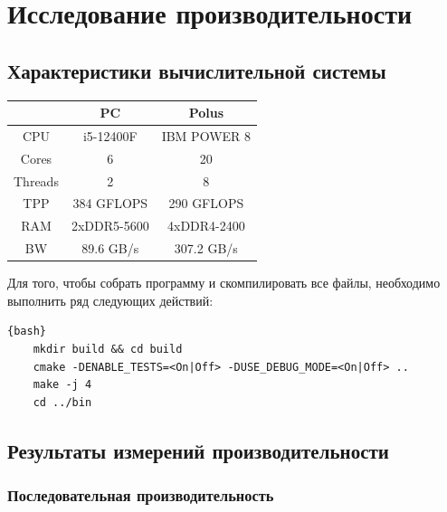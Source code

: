 \documentclass[12pt, a4paper]{article}
\begin{document}
\newpage

\section{Исследование производительности}

\subsection{Характеристики вычислительной системы}

\begin{center}
	\setlength{\tabcolsep}{30pt}
	\renewcommand{\arraystretch}{1.5}
	\begin{tabular}{ c|c|c } 
		 & PC & Polus \\ 
		\hline
		CPU  & i5-12400F & IBM POWER 8 \\ 
		Cores & 6 & 20 \\ 
		Threads & 2 & 8 \\
		TPP & 384 GFLOPS & 290 GFLOPS \\
		RAM & 2xDDR5-5600  & 4xDDR4-2400 \\
		BW & 89.6 GB/s & 307.2 GB/s \\
	\end{tabular}
\end{center}

Для того, чтобы собрать программу и скомпилировать все файлы, необходимо выполнить ряд следующих действий:

\begin{lstlisting}{bash}
	mkdir build && cd build
	cmake -DENABLE_TESTS=<On|Off> -DUSE_DEBUG_MODE=<On|Off> ..
	make -j 4
	cd ../bin
\end{lstlisting}



\subsection{Результаты измерений производительности}

\subsubsection{Последовательная производительность}
\end{document}
